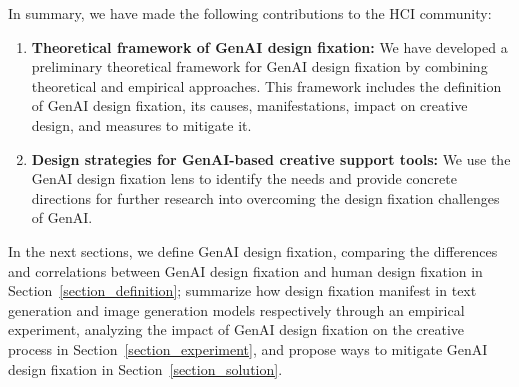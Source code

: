 In summary, we have made the following contributions to the HCI community:
\begin{enumerate}
    \item \textbf{Theoretical framework of GenAI design fixation: }We have developed a preliminary theoretical framework for GenAI design fixation by combining theoretical and empirical approaches. This framework includes the definition of GenAI design fixation, its causes, manifestations, impact on creative design, and measures to mitigate it.
    \item \textbf{Design strategies for GenAI-based creative support tools: }We use the GenAI design fixation lens to identify the needs and provide concrete directions for further research into overcoming the design fixation challenges of GenAI.
\end{enumerate}


In the next sections, we define GenAI design fixation, comparing the differences and correlations between GenAI design fixation and human design fixation in Section~\ref{section_definition}; summarize how design fixation manifest in text generation and image generation models respectively through an empirical experiment, analyzing the impact of GenAI design fixation on the creative process in Section~\ref{section_experiment}, and propose ways to mitigate GenAI design fixation in Section~\ref{section_solution}.
	
